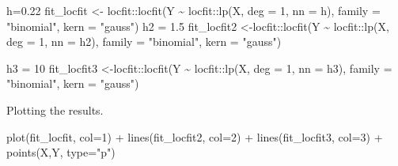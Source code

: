 \documentclass[
]{article}
\newenvironment{Shaded}{\begin{snugshade}}{\end{snugshade}}
\newcommand{\AttributeTok}[1]{\textcolor[rgb]{0.77,0.63,0.00}{#1}}
\newcommand{\DecValTok}[1]{\textcolor[rgb]{0.00,0.00,0.81}{#1}}
\newcommand{\FloatTok}[1]{\textcolor[rgb]{0.00,0.00,0.81}{#1}}
\newcommand{\FunctionTok}[1]{\textcolor[rgb]{0.00,0.00,0.00}{#1}}
\newcommand{\NormalTok}[1]{#1}
\newcommand{\OtherTok}[1]{\textcolor[rgb]{0.56,0.35,0.01}{#1}}
\newcommand{\SpecialCharTok}[1]{\textcolor[rgb]{0.00,0.00,0.00}{#1}}
\newcommand{\StringTok}[1]{\textcolor[rgb]{0.31,0.60,0.02}{#1}}
\begin{document}
\begin{Shaded}
\begin{Highlighting}[]
\NormalTok{h}\OtherTok{=}\FloatTok{0.22}
\NormalTok{fit\_locfit }\OtherTok{\textless{}{-}}\NormalTok{ locfit}\SpecialCharTok{::}\FunctionTok{locfit}\NormalTok{(Y }\SpecialCharTok{\textasciitilde{}}\NormalTok{ locfit}\SpecialCharTok{::}\FunctionTok{lp}\NormalTok{(X, }\AttributeTok{deg =} \DecValTok{1}\NormalTok{, }\AttributeTok{nn =}\NormalTok{ h),}
                             \AttributeTok{family =} \StringTok{"binomial"}\NormalTok{, }\AttributeTok{kern =} \StringTok{"gauss"}\NormalTok{)}
\NormalTok{h2 }\OtherTok{=} \FloatTok{1.5}
\NormalTok{fit\_locfit2 }\OtherTok{\textless{}{-}}\NormalTok{locfit}\SpecialCharTok{::}\FunctionTok{locfit}\NormalTok{(Y }\SpecialCharTok{\textasciitilde{}}\NormalTok{ locfit}\SpecialCharTok{::}\FunctionTok{lp}\NormalTok{(X, }\AttributeTok{deg =} \DecValTok{1}\NormalTok{, }\AttributeTok{nn =}\NormalTok{ h2),}
                               \AttributeTok{family =} \StringTok{"binomial"}\NormalTok{, }\AttributeTok{kern =} \StringTok{"gauss"}\NormalTok{)}

\NormalTok{h3 }\OtherTok{=} \DecValTok{10}
\NormalTok{fit\_locfit3 }\OtherTok{\textless{}{-}}\NormalTok{locfit}\SpecialCharTok{::}\FunctionTok{locfit}\NormalTok{(Y }\SpecialCharTok{\textasciitilde{}}\NormalTok{ locfit}\SpecialCharTok{::}\FunctionTok{lp}\NormalTok{(X, }\AttributeTok{deg =} \DecValTok{1}\NormalTok{, }\AttributeTok{nn =}\NormalTok{ h3),}
                               \AttributeTok{family =} \StringTok{"binomial"}\NormalTok{, }\AttributeTok{kern =} \StringTok{"gauss"}\NormalTok{)}
\end{Highlighting}
\end{Shaded}

Plotting the results.

\begin{Shaded}
\begin{Highlighting}[]
\FunctionTok{plot}\NormalTok{(fit\_locfit, }\AttributeTok{col=}\DecValTok{1}\NormalTok{) }\SpecialCharTok{+} \FunctionTok{lines}\NormalTok{(fit\_locfit2, }\AttributeTok{col=}\DecValTok{2}\NormalTok{)  }\SpecialCharTok{+} \FunctionTok{lines}\NormalTok{(fit\_locfit3, }\AttributeTok{col=}\DecValTok{3}\NormalTok{) }\SpecialCharTok{+} \FunctionTok{points}\NormalTok{(X,Y, }\AttributeTok{type=}\StringTok{"p"}\NormalTok{)}
\end{Highlighting}
\end{Shaded}
\end{document}

